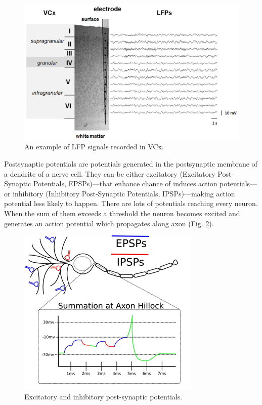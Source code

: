 \documentclass{pracalicmgr}
\begin{document}
   \begin{figure}[H]
   	\begin{center}
   		\includegraphics[scale=0.5]{VCx_LFPs2.png}
   	\end{center}
   	\caption{ An example of LFP signals recorded in VCx.}
   	\label{rys:VCx_LFPs}
   \end{figure} 
   
   Postsynaptic potentials are potentials generated in the postsynaptic membrane of a dendrite of a nerve cell. They can be either excitatory (Excitatory Post-Synaptic Potentials, EPSPs)---that enhance chance of induces action potentials---or inhibitory (Inhibitory Post-Synaptic Potentials, IPSPs)---making action potential less likely to happen. There are lots of potentials reaching every neuron. When the sum of them exceeds a threshold the neuron becomes excited and generates an action potential which propagates along axon (Fig. \ref{rys:PSPs}).
   \begin{figure}[htbp]
   	\begin{center}
   		\includegraphics[scale=1]{PSPs.png}
   	\end{center}
   	\caption{Excitatory and inhibitory post-synaptic potentials.}
   	\label{rys:PSPs}
   \end{figure} 
   
\end{document}
